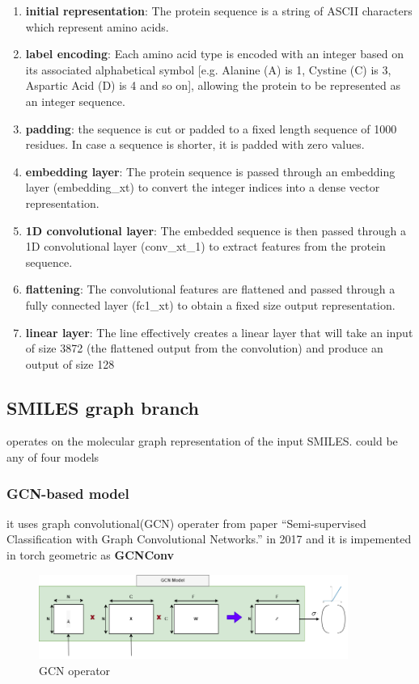 \documentclass[11pt, a4paper]{article}
\begin{document}
        \begin{enumerate}
            \item \textbf{initial representation}: The protein sequence is a string of ASCII characters which represent amino acids.
            \item \textbf{label encoding}: Each amino acid type is encoded with an integer based on its associated alphabetical symbol [e.g. Alanine (A) is 1, Cystine (C) is 3, Aspartic Acid (D) is 4 and so on], allowing the protein to be represented as an integer sequence. 
            \item \textbf{padding}: the sequence is cut or padded to a fixed length sequence of 1000 residues. In case a sequence is shorter, it is padded with zero values.
            \item \textbf{embedding layer}: The protein sequence is passed through an embedding layer (embedding\_xt) to convert the integer indices into a dense vector representation.
            \item \textbf{1D convolutional layer}: The embedded sequence is then passed through a 1D convolutional layer (conv\_xt\_1) to extract features from the protein sequence.
            \item \textbf{flattening}: The convolutional features are flattened and passed through a fully connected layer (fc1\_xt) to obtain a fixed size output representation.
            \item \textbf{linear layer}: The line effectively creates a linear layer that will take an input of size 3872 (the flattened output from the convolution) and produce an output of size 128
        \end{enumerate} 

    \subsection{SMILES graph branch}
        operates on the molecular graph representation of the input SMILES. could be any of four models
        
            \subsubsection{GCN-based model}
                
                it uses graph convolutional(GCN) operater from paper ``Semi-supervised Classification with Graph Convolutional Networks.'' in 2017 and it is impemented in torch geometric as \textbf{GCNConv}
                \begin{figure}[H]
                    \centering
                    \includegraphics[width=0.9\textwidth]{model/GCN_Model.drawio.png} %
                    \caption{GCN operator}
                \end{figure}
\end{document}
